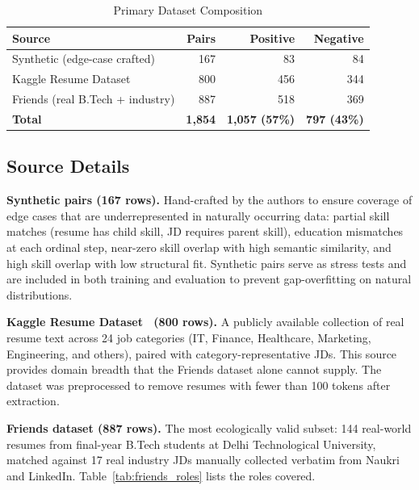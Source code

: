 \documentclass[conference]{IEEEtran}
\begin{document}
\begin{table}[htbp]
\caption{Primary Dataset Composition}
\label{tab:data}
\centering
\begin{tabular}{lrrr}
\toprule
\textbf{Source} & \textbf{Pairs} & \textbf{Positive} & \textbf{Negative} \\
\midrule
Synthetic (edge-case crafted)    & 167  &  83   &  84  \\
Kaggle Resume Dataset            & 800  & 456   & 344  \\
Friends (real B.Tech + industry) & 887  & 518   & 369  \\
\midrule
\textbf{Total}
  & \textbf{1,854} & \textbf{1,057 (57\%)} & \textbf{797 (43\%)} \\
\bottomrule
\end{tabular}
\end{table}

\subsection{Source Details}

\textbf{Synthetic pairs (167 rows).}
Hand-crafted by the authors to ensure coverage of edge cases that are
underrepresented in naturally occurring data: partial skill matches
(resume has child skill, JD requires parent skill), education mismatches
at each ordinal step, near-zero skill overlap with high semantic similarity,
and high skill overlap with low structural fit. Synthetic pairs serve as
stress tests and are included in both training and evaluation to prevent
gap-overfitting on natural distributions.

\textbf{Kaggle Resume Dataset~\cite{kaggle_resume} (800 rows).}
A publicly available collection of real resume text across 24 job categories
(IT, Finance, Healthcare, Marketing, Engineering, and others), paired with
category-representative JDs. This source provides domain breadth that the
Friends dataset alone cannot supply. The dataset was preprocessed to
remove resumes with fewer than 100 tokens after extraction.

\textbf{Friends dataset (887 rows).}
The most ecologically valid subset: 144 real-world resumes from final-year
B.Tech students at Delhi Technological University, matched against 17 real
industry JDs manually collected verbatim from Naukri and LinkedIn.
Table~\ref{tab:friends_roles} lists the roles covered.
\end{document}
